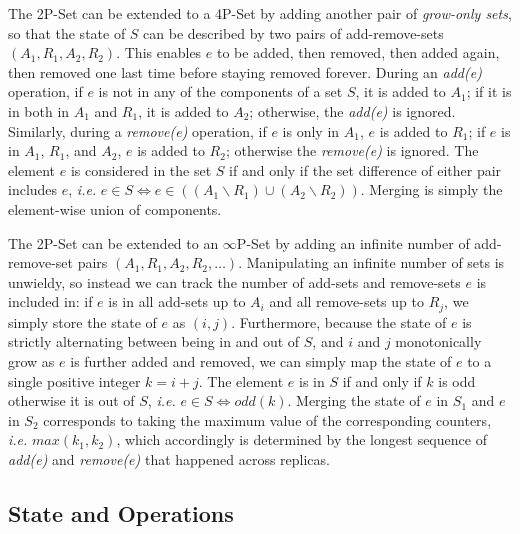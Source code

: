 \documentclass[10pt, oneside]{article}   	%
\begin{document}
The 2P-Set can be extended to a 4P-Set by adding another pair of \textit{grow-only sets}, so that the state of $S$ can be described by two pairs of add-remove-sets $(A_1,R_1,A_2,R_2)$.  This enables $e$ to be added, then removed, then added again, then removed one last time before staying removed forever. During an \textit{add(e)} operation, if $e$ is not in any of the components of a set $S$, it is added to $A_1$; if it is in both in $A_1$ and $R_1$, it is added to $A_2$; otherwise, the \textit{add(e)} is ignored. Similarly, during a \textit{remove(e)} operation, if $e$ is only in $A_1$, $e$ is added to $R_1$; if $e$ is in $A_1$, $R_1$, and $A_2$, $e$ is added to $R_2$; otherwise the \textit{remove(e)} is ignored. The element $e$ is considered in the set $S$ if and only if the set difference of either pair includes $e$, \textit{i.e.} $e \in S \Leftrightarrow e \in  ((A_1 \backslash R_1) \cup (A_2 \backslash R_2))$. Merging is simply the element-wise union of components.

The 2P-Set can be extended to an $\infty$P-Set by adding an infinite number of add-remove-set pairs $(A_1, R_1, A_2, R_2, \dots)$. Manipulating an infinite number of sets is unwieldy, so instead we can track the number of add-sets and remove-sets 
$e$ is included in: if $e$ is in all add-sets up to $A_i$ and all remove-sets up to $R_{j}$, we simply store the state of $e$ as $(i, j)$. Furthermore, because the state of $e$ is strictly alternating between being in and out of $S$, and $i$ and $j$ monotonically grow as $e$ is further added and removed, we can simply map the state of $e$ to a single positive integer $k=i+j$. The element $e$ is in $S$ if and only if $k$ is odd otherwise it is out of $S$, \textit{i.e.} $e \in S \Leftrightarrow odd(k)$. Merging the state of $e$ in $S_1$ and $e$ in $S_2$ corresponds to taking the maximum value of the corresponding counters, \textit{i.e.} $\textit{max}(k_1, k_2)$, which accordingly is determined by the longest sequence of \textit{add(e)} and \textit{remove(e)} that happened across replicas. 

\subsection{State and Operations}
\label{sec:data-type}
\end{document}
